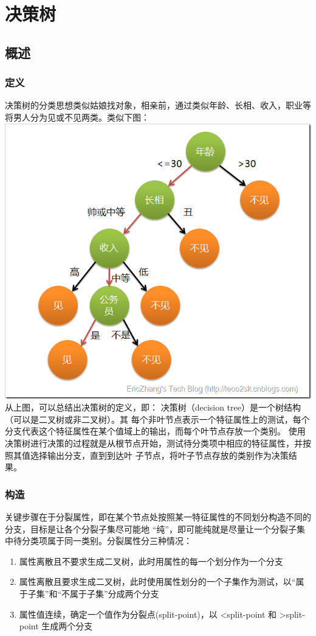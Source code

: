 \documentclass[11pt]{ctexart}
\begin{document}
\section{决策树}
\label{sec:orgheadline32}
\subsection{概述}
\label{sec:orgheadline15}
\subsubsection{定义}
\label{sec:orgheadline12}
决策树的分类思想类似姑娘找对象，相亲前，通过类似年龄、长相、收入，职业等将男人分为见或不见两类。类似下图：
\includegraphics[width=.9\linewidth]{figs/decision_tree.png}
从上图，可以总结出决策树的定义，即： 决策树（decision tree）是一个树结构（可以是二叉树或非二叉树）。其
每个非叶节点表示一个特征属性上的测试，每个分支代表这个特征属性在某个值域上的输出，而每个叶节点存放一个类别。
使用决策树进行决策的过程就是从根节点开始，测试待分类项中相应的特征属性，并按照其值选择输出分支，直到到达叶
子节点，将叶子节点存放的类别作为决策结果。
\subsubsection{构造}
\label{sec:orgheadline13}
关键步骤在于分裂属性，即在某个节点处按照某一特征属性的不同划分构造不同的分支，目标是让各个分裂子集尽可能地
“纯”，即可能纯就是尽量让一个分裂子集中待分类项属于同一类别。分裂属性分三种情况：
\begin{enumerate}
\item 属性离散且不要求生成二叉树，此时用属性的每一个划分作为一个分支
\item 属性离散且要求生成二叉树，此时使用属性划分的一个子集作为测试，以“属于子集”和“不属于子集”分成两个分支
\item 属性值连续，确定一个值作为分裂点(split-point)，以 <split-point 和 >split-point 生成两个分支
\end{enumerate}
\end{document}
